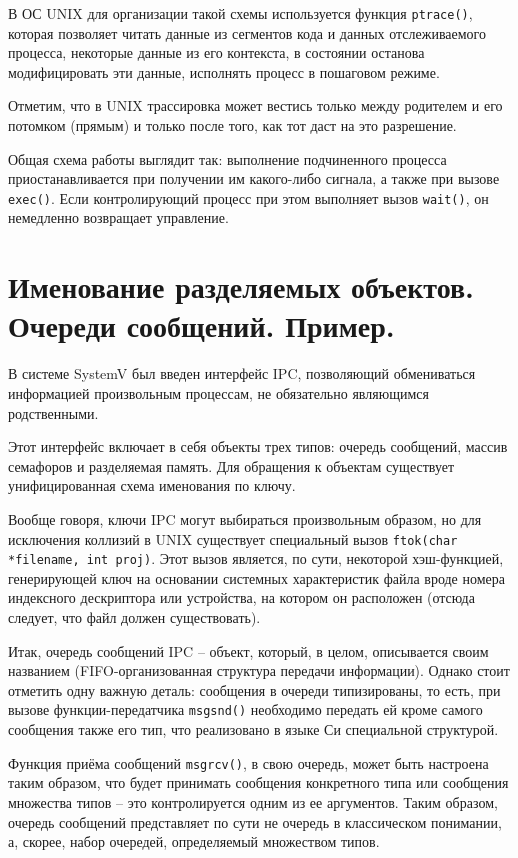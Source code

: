 \documentclass[a4paper,12pt,titlepage,finall]{article}
\begin{document}
В ОС UNIX для организации такой схемы используется функция \texttt{ptrace()}, которая позволяет читать данные из сегментов кода и данных отслеживаемого процесса, некоторые данные из его контекста, в состоянии останова модифицировать эти данные, исполнять процесс в пошаговом режиме.

Отметим, что в UNIX трассировка может вестись только между родителем и его потомком (прямым) и только после того, как тот даст на это разрешение. 

Общая схема работы выглядит так: выполнение подчиненного процесса приостанавливается при получении им какого-либо сигнала, а также при вызове \texttt{exec()}. Если контролирующий процесс при этом выполняет вызов \texttt{wait()}, он немедленно возвращает управление.

\section{Именование разделяемых объектов. Очереди
сообщений. Пример.}
В системе SystemV был введен интерфейс IPC, позволяющий обмениваться информацией произвольным процессам, не обязательно являющимся родственными.

Этот интерфейс включает в себя объекты трех типов: очередь сообщений, массив семафоров и разделяемая память. Для обращения к объектам существует унифицированная схема именования по ключу.

Вообще говоря, ключи IPC могут выбираться произвольным образом, но для исключения коллизий в UNIX существует специальный вызов \texttt{ftok(char *filename, int proj)}. Этот вызов является, по сути, некоторой хэш-функцией, генерирующей ключ на основании системных характеристик файла вроде номера индексного дескриптора или устройства, на котором он расположен (отсюда следует, что файл должен существовать).

Итак, очередь сообщений IPC -- объект, который, в целом, описывается своим названием (FIFO-организованная структура передачи информации). Однако стоит отметить одну важную деталь: сообщения в очереди типизированы, то есть, при вызове функции-передатчика \texttt{msgsnd()} необходимо передать ей кроме самого сообщения также его тип, что реализовано в языке Си специальной структурой.

Функция приёма сообщений \texttt{msgrcv()}, в свою очередь, может быть настроена таким образом, что будет принимать сообщения конкретного типа или сообщения множества типов -- это контролируется одним из ее аргументов. Таким образом, очередь сообщений представляет по сути не очередь в классическом понимании, а, скорее, набор очередей, определяемый множеством типов.
\end{document}
